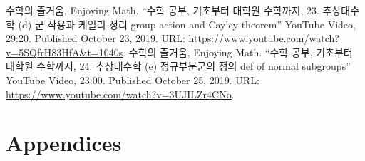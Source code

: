 \documentclass[11pt,openany]{article}
\begin{document}
%
%
%



\vfill
\begin{thebibliography}{9}
	수학의 즐거움, Enjoying Math. ``수학 공부, 기초부터 대학원 수학까지, 23. 추상대수학 (d) 군 작용과 케일리-정리 group action and Cayley theorem'' YouTube Video, 29:20. Published 
	October 23, 2019. URL: \url{https://www.youtube.com/watch?v=5SQfrH83HfA&t=1040s}.
	수학의 즐거움, Enjoying Math. ``수학 공부, 기초부터 대학원 수학까지, 24. 추상대수학 (e) 정규부분군의 정의 def of normal subgroups'' YouTube Video, 23:00. Published 
	October 25, 2019. URL: \url{https://www.youtube.com/watch?v=3UJILZr4CNo}.
\end{thebibliography}

\newpage
\appendix
\section{Appendices}
\end{document}
